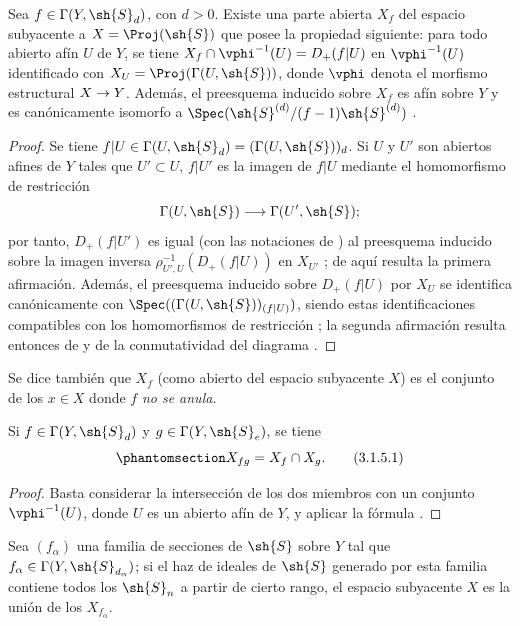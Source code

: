 \documentclass[oneside,10pt]{amsart}
\makeatletter
\newcommand{\ega@arrow}[2]{\mathchoice{#1}{#2}{#2}{#2}}
\renewcommand{\to}{\ega@arrow{\longrightarrow}{\rightarrow}}
\newcommand{\oldpage}[2][]{\marginnote{\normalfont\footnotesize\textbf{#1}~|~#2}\ignorespaces}
\let\EGAOriginalLabel\label
\renewcommand{\label}[1]{\phantomsection\EGAOriginalLabel{#1}}
\makeatother
\begin{document}
\begin{proposition}[3.1.4]
\label{II.3.1.4}
Sea $f\in\Gamma(Y,\sh{S}_d)$, con $d>0$.
Existe una parte abierta $X_f$ del espacio subyacente a $X=\Proj(\sh{S})$ que posee la propiedad siguiente: para todo abierto afín $U$ de $Y$, se tiene $X_f\cap\vphi^{-1}(U)=D_+(f|U)$ en $\vphi^{-1}(U)$ identificado con $X_U=\Proj(\Gamma(U,\sh{S}))$, donde $\vphi$ denota el morfismo estructural $X\to Y$.
\oldpage[II]{51}
Además, el preesquema inducido sobre $X_f$ es afín sobre $Y$ y es canónicamente isomorfo a $\Spec(\sh{S}^{(d)}/(f-1)\sh{S}^{(d)})$ .
\end{proposition}

\begin{proof}
Se tiene $f|U\in\Gamma(U,\sh{S}_d)=(\Gamma(U,\sh{S}))_d$.
Si $U$ y $U'$ son abiertos afines de $Y$ tales que $U'\subset U$, $f|U'$ es la imagen de $f|U$ mediante el homomorfismo de restricción
\[
  \Gamma(U,\sh{S}) \to \Gamma(U',\sh{S});
\]
por tanto, $D_+(f|U')$ es igual (con las notaciones de ) al preesquema inducido sobre la imagen inversa $\rho_{U',U}^{-1}(D_+(f|U))$ en $X_{U'}$ ; de aquí resulta la primera afirmación.
Además, el preesquema inducido sobre $D_+(f|U)$ por $X_U$ se identifica canónicamente con $\Spec((\Gamma(U,\sh{S}))_{(f|U)})$, siendo estas identificaciones compatibles con los homomorfismos de restricción ; la segunda afirmación resulta entonces de  y de la conmutatividad del diagrama .
\end{proof}

Se dice también que $X_f$ (como abierto del espacio subyacente $X$) es el conjunto de los $x\in X$ donde $f$ \emph{no se anula}.

\begin{corollary}[3.1.5]
\label{II.3.1.5}
Si $f\in\Gamma(Y,\sh{S}_d)$ y $g\in\Gamma(Y,\sh{S}_e)$, se tiene
\[
\label{II.3.1.5.1}
  X_{fg}=X_f\cap X_g.
\tag{3.1.5.1}
\]
\end{corollary}

\begin{proof}
Basta considerar la intersección de los dos miembros con un conjunto $\vphi^{-1}(U)$, donde $U$ es un abierto afín de $Y$, y aplicar la fórmula .
\end{proof}

\begin{corollary}[3.1.6]
\label{II.3.1.6}
Sea $(f_\alpha)$ una familia de secciones de $\sh{S}$ sobre $Y$ tal que $f_\alpha\in\Gamma(Y,\sh{S}_{d_\alpha})$; si el haz de ideales de $\sh{S}$ generado por esta familia  contiene todos los $\sh{S}_n$ a partir de cierto rango, el espacio subyacente $X$ es la unión de los $X_{f_\alpha}$.
\end{corollary}
\end{document}
